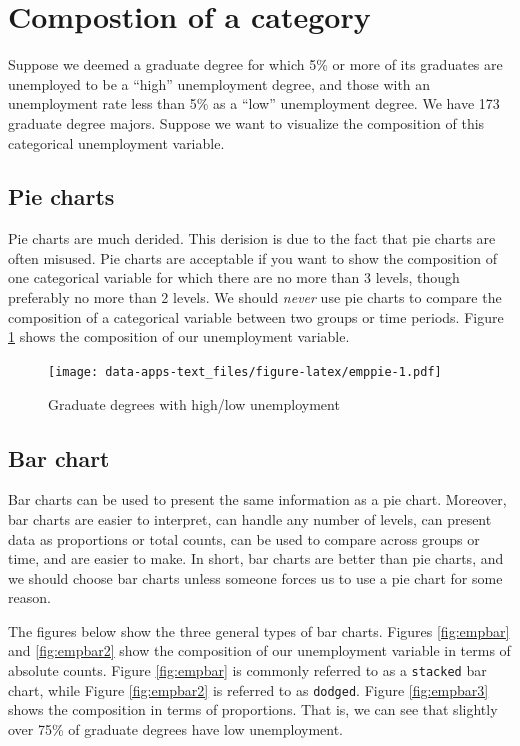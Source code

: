 \documentclass[
]{book}
\begin{document}
\hypertarget{compostion-of-a-category}{%
\section{Compostion of a category}\label{compostion-of-a-category}}

Suppose we deemed a graduate degree for which 5\% or more of its graduates are unemployed to be a ``high'' unemployment degree, and those with an unemployment rate less than 5\% as a ``low'' unemployment degree. We have 173 graduate degree majors. Suppose we want to visualize the composition of this categorical unemployment variable.

\hypertarget{pie-charts}{%
\subsection{Pie charts}\label{pie-charts}}

Pie charts are much derided. This derision is due to the fact that pie charts are often misused. Pie charts are acceptable if you want to show the composition of one categorical variable for which there are no more than 3 levels, though preferably no more than 2 levels. We should \emph{never} use pie charts to compare the composition of a categorical variable between two groups or time periods. Figure \ref{fig:emppie} shows the composition of our unemployment variable.

\begin{figure}
\centering
\texttt{[image: data-apps-text\_files/figure-latex/emppie-1.pdf]}
\caption{\label{fig:emppie}Graduate degrees with high/low unemployment}
\end{figure}

\hypertarget{bar-chart}{%
\subsection{Bar chart}\label{bar-chart}}

Bar charts can be used to present the same information as a pie chart. Moreover, bar charts are easier to interpret, can handle any number of levels, can present data as proportions or total counts, can be used to compare across groups or time, and are easier to make. In short, bar charts are better than pie charts, and we should choose bar charts unless someone forces us to use a pie chart for some reason.

The figures below show the three general types of bar charts. Figures \ref{fig:empbar} and \ref{fig:empbar2} show the composition of our unemployment variable in terms of absolute counts. Figure \ref{fig:empbar} is commonly referred to as a \texttt{stacked} bar chart, while Figure \ref{fig:empbar2} is referred to as \texttt{dodged}. Figure \ref{fig:empbar3} shows the composition in terms of proportions. That is, we can see that slightly over 75\% of graduate degrees have low unemployment.
\end{document}
